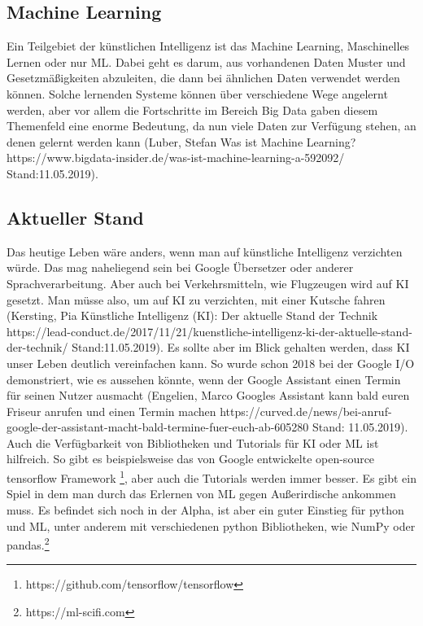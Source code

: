 \documentclass[12pt,a4paper]{article}
\begin{document}
	\subsection{Machine Learning}
	Ein Teilgebiet der künstlichen Intelligenz ist das Machine Learning, Maschinelles Lernen oder nur ML. Dabei geht es darum, aus vorhandenen Daten Muster und Gesetzmäßigkeiten abzuleiten, die dann bei ähnlichen Daten verwendet werden können. Solche lernenden Systeme können über verschiedene Wege angelernt werden, aber vor allem die Fortschritte im Bereich Big Data gaben diesem Themenfeld  eine enorme Bedeutung, da nun viele Daten zur Verfügung stehen, an denen gelernt werden kann (Luber, Stefan \glqq Was ist Machine Learning?\grqq{} https://www.bigdata-insider.de/was-ist-machine-learning-a-592092/ Stand:11.05.2019).
	\subsection{Aktueller Stand}
	Das heutige Leben wäre anders, wenn man auf künstliche Intelligenz verzichten würde. Das mag naheliegend sein bei Google Übersetzer oder anderer Sprachverarbeitung. Aber auch bei Verkehrsmitteln, wie Flugzeugen wird auf KI gesetzt. Man müsse also, um auf KI zu verzichten, mit einer Kutsche fahren (Kersting, Pia \glqq Künstliche Intelligenz (KI): Der aktuelle Stand der Technik\grqq{} https://lead-conduct.de/2017/11/21/kuenstliche-intelligenz-ki-der-aktuelle-stand-der-technik/ Stand:11.05.2019).
	Es sollte aber im Blick gehalten werden, dass KI unser Leben deutlich vereinfachen kann. So wurde schon 2018 bei der Google I/O demonstriert, wie es aussehen könnte, wenn der Google Assistant einen Termin für seinen Nutzer ausmacht (Engelien, Marco \glqq Googles Assistant kann bald euren Friseur anrufen und einen Termin machen\grqq{} https://curved.de/news/bei-anruf-google-der-assistant-macht-bald-termine-fuer-euch-ab-605280 Stand: 11.05.2019).
	Auch die Verfügbarkeit von Bibliotheken und Tutorials für KI oder ML ist hilfreich. So gibt es beispielsweise das von Google entwickelte open-source tensorflow Framework \footnote{https://github.com/tensorflow/tensorflow}, aber auch die Tutorials werden immer besser. Es gibt ein Spiel in dem man durch das Erlernen von ML gegen Außerirdische ankommen muss. Es befindet sich noch in der Alpha, ist aber ein guter Einstieg für python und ML, unter anderem mit verschiedenen python Bibliotheken, wie NumPy oder pandas.\footnote{https://ml-scifi.com}
\end{document}
